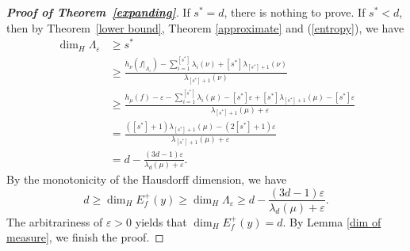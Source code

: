 \documentclass[11pt,a4paper]{amsart}
\theoremstyle{plain}
\theoremstyle{remark}
\begin{document}
\begin{proof}[\textbf{Proof of Theorem~\ref{expanding}}]
		If $s^{\ast}=d$, there is nothing to prove. If $s^{\ast}<d$, then by Theorem~\ref{lower bound}, Theorem \ref{approximate} and (\ref{entropy}), we have
		\begin{align*}
			\dim_{H} \Lambda_{\varepsilon}&\geq s^{\ast}\\
			&\geq \frac{h_{\nu}(f|_{\Lambda_{\varepsilon}})-\sum_{i=1}^{[s^{\ast}]}\lambda_{i}(\nu)+[s^{\ast}]\lambda_{[s^{\ast}]+1}(\nu)}{\lambda_{[s^{\ast}]+1}(\nu)}\\
			&\geq \frac{h_{\mu}(f)-\varepsilon-\sum_{i=1}^{[s^{\ast}]}\lambda_{i}(\mu)-[s^{\ast}]\varepsilon+[s^{\ast}]\lambda_{[s^{\ast}]+1}(\mu)-[s^{\ast}]\varepsilon}{\lambda_{[s^{\ast}]+1}(\mu)+\varepsilon}\\
			&=\frac{([s^{\ast}]+1)\lambda_{[s^{\ast}]+1}(\mu)-(2[s^{\ast}]+1)\varepsilon}{\lambda_{[s^{\ast}]+1}(\mu)+\varepsilon}\\
			&=d-\frac{(3d-1)\varepsilon}{\lambda_{d}(\mu)+\varepsilon}.
		\end{align*}
		By the monotonicity of the Hausdorff dimension, we have $$d\geq \dim_{H}E^{+}_{f}(y)\geq \dim_{H} \Lambda_{\varepsilon}\geq d-\frac{(3d-1)\varepsilon}{\lambda_{d}(\mu)+\varepsilon}.$$ The arbitrariness of $\varepsilon>0$ yields that $\dim_{H}E^{+}_{f}(y)=d$. By Lemma \ref{dim of measure}, we finish the proof.
		
		
		
	\end{proof}
\end{document}
